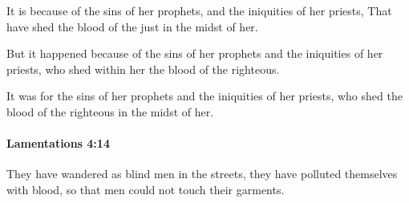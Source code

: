 			\begin{versebox}
					\item[BHS] 
					\item[LXX] 
					\item[ASV] It is because of the sins of her prophets, and the iniquities of her priests, That have shed the blood of the just in the midst of her.
					\item[NIV] But it happened because of the sins of her prophets and the iniquities of her priests, who shed within her the blood of the righteous.
					\item[NRSV] It was for the sins of her prophets and the iniquities of her priests, who shed the blood of the righteous in the midst of her.
			\end{versebox}

		\paragraph{Lamentations 4:14} %
			\label{LAMENTATIONS-4-14}

			They have wandered as blind men in the streets, they have polluted themselves with blood, so that men could not touch their garments.

